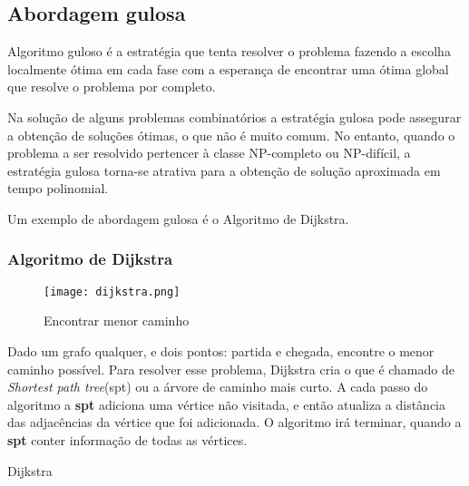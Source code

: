 \subsection{Abordagem gulosa}

    Algoritmo guloso é a estratégia que tenta resolver o problema fazendo a 
    escolha localmente ótima em cada fase com a esperança de encontrar 
    uma ótima global que resolve o problema por completo.

    Na solução de alguns problemas combinatórios a estratégia gulosa pode
    assegurar a obtenção de soluções ótimas, o que não é muito comum. No
    entanto, quando o problema a ser resolvido pertencer à classe NP-completo
    ou NP-difícil, a estratégia gulosa torna-se atrativa para a obtenção de
    solução aproximada em tempo polinomial.

    Um exemplo de abordagem gulosa é o Algoritmo de Dijkstra.

\subsubsection{Algoritmo de Dijkstra}

    \begin{figure}[ht]
        \centering
        \texttt{[image: dijkstra.png]}
        \caption{Encontrar menor caminho}
        \label{fig:dikstra}
    \end{figure}

    Dado um grafo qualquer, e dois pontos: partida e chegada, encontre o menor caminho possível.
    Para resolver esse problema, Dijkstra cria o que é chamado de \emph{Shortest path tree}(spt) ou 
    a árvore de caminho mais curto. A cada passo do algoritmo a \textbf{spt} adiciona uma vértice não visitada,
    e então atualiza a distância das adjacências da vértice que foi adicionada. O algoritmo irá terminar, quando 
    a \textbf{spt} conter informação de todas as vértices.

    \newpage 

    \begin{algorithm}
        \caption{Dijkstra} 
        \begin{algorithmic}[1]
        \EndFor
        \EndFor
        \EndFor
        \EndProcedure
        \end{algorithmic}
    \end{algorithm}

